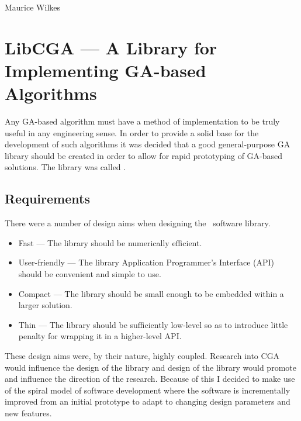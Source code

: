 \begin{savequote}[0.5\paperwidth]
%
{Maurice Wilkes}
\end{savequote}

\chapter{LibCGA --- A Library for Implementing GA-based Algorithms}

Any GA-based algorithm must have a method of implementation to be
truly useful in any engineering sense. In order to provide a solid
base for the development of such algorithms it was decided that
a good general-purpose GA library should be created in order to 
allow for rapid prototyping of GA-based solutions. The library 
was called \libcga{}.

\section{Requirements}

There were a number of design aims when designing the \libcga\ software library.

\begin{itemize}
\item Fast --- The library should be numerically efficient.
\item User-friendly --- The library Application Programmer's Interface (API) should be convenient and simple to use.
\item Compact --- The library should be small enough to be embedded within
a larger solution.
\item Thin --- The library should be sufficiently low-level so as to introduce
little penalty for wrapping it in a higher-level API.
\end{itemize}

These design aims were, by their nature, highly coupled. Research into
CGA would influence the design of the library and design of the library would
promote and influence the direction of the research. Because of this
I decided to make use of the spiral model of software development where
the software is incrementally improved from an initial prototype to adapt
to changing design parameters and new features.

